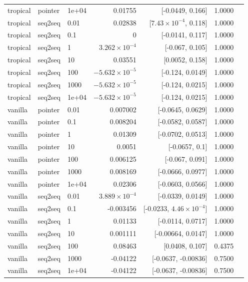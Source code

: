 \documentclass[10pt]{article}
\begin{document}
{\begin{longtable}{lllrrrl}
tropical & pointer & 1e+04 & 0.01755 & [-0.0449, 0.166] & 1.0000 & \\
tropical & seq2seq & 0.01 & 0.02838 & [$7.43\times10^{-4}$, 0.118] & 1.0000 & \\
tropical & seq2seq & 0.1 & 0 & [-0.0141, 0.117] & 1.0000 & \\
tropical & seq2seq & 1 & $3.262\times10^{-4}$ & [-0.067, 0.105] & 1.0000 & \\
tropical & seq2seq & 10 & 0.03551 & [0.0052, 0.158] & 1.0000 & \\
tropical & seq2seq & 100 & $-5.632\times10^{-5}$ & [-0.124, 0.0149] & 1.0000 & \\
tropical & seq2seq & 1000 & $-5.632\times10^{-5}$ & [-0.124, 0.0215] & 1.0000 & \\
tropical & seq2seq & 1e+04 & $-5.632\times10^{-5}$ & [-0.124, 0.0215] & 1.0000 & \\
vanilla & pointer & 0.01 & 0.007002 & [-0.0645, 0.0629] & 1.0000 & \\
vanilla & pointer & 0.1 & 0.008204 & [-0.0582, 0.0587] & 1.0000 & \\
vanilla & pointer & 1 & 0.01309 & [-0.0702, 0.0513] & 1.0000 & \\
vanilla & pointer & 10 & 0.0051 & [-0.0657, 0.1] & 1.0000 & \\
vanilla & pointer & 100 & 0.006125 & [-0.067, 0.091] & 1.0000 & \\
vanilla & pointer & 1000 & 0.008169 & [-0.0666, 0.0977] & 1.0000 & \\
vanilla & pointer & 1e+04 & 0.02306 & [-0.0603, 0.0566] & 1.0000 & \\
vanilla & seq2seq & 0.01 & $3.889\times10^{-4}$ & [-0.0339, 0.0149] & 1.0000 & \\
vanilla & seq2seq & 0.1 & -0.003456 & [-0.0233, $4.46\times10^{-4}$] & 1.0000 & \\
vanilla & seq2seq & 1 & 0.01133 & [-0.0114, 0.0717] & 1.0000 & \\
vanilla & seq2seq & 10 & 0.001111 & [-0.00664, 0.0147] & 1.0000 & \\
vanilla & seq2seq & 100 & 0.08463 & [0.0408, 0.107] & 0.4375 & \\
vanilla & seq2seq & 1000 & -0.04122 & [-0.0637, -0.00836] & 0.7500 & \\
vanilla & seq2seq & 1e+04 & -0.04122 & [-0.0637, -0.00836] & 0.7500 & \\
\bottomrule
\end{longtable}
}
\end{document}
